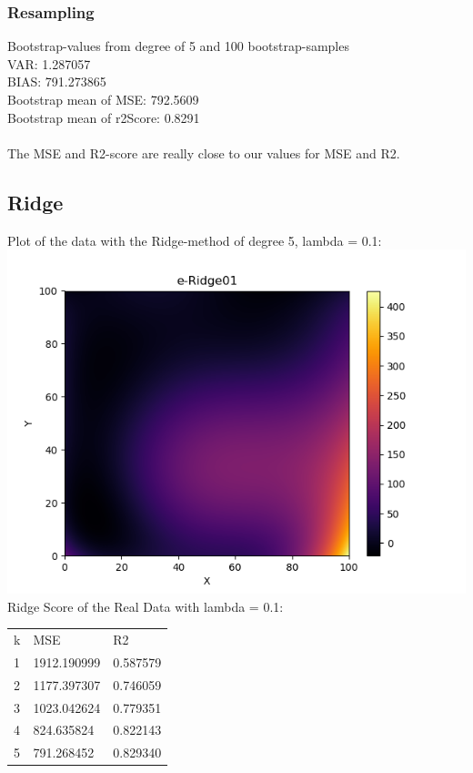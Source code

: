 \documentclass[a4paper,norsk]{article}
\begin{document}
\subsubsection{Resampling}
Bootstrap-values from degree of 5 and 100 bootstrap-samples
\\VAR: 1.287057
\\BIAS: 791.273865
\\Bootstrap mean of MSE: 792.5609
\\Bootstrap mean of r2Score: 0.8291
\\
\\The MSE and R2-score are really close to our values for MSE and R2.

\subsection{Ridge}
Plot of the data with the Ridge-method of degree 5, lambda = 0.1:
\\ \includegraphics[scale=.7]{e-Ridge01}
\\ Ridge Score of the Real Data with lambda = 0.1:
\begin{table}[!h]
\begin{tabular}{lll}
k & MSE                   & R2                 \\
1 & 1912.190999  & 0.587579 \\
2 & 1177.397307  & 0.746059 \\
3 & 1023.042624  & 0.779351 \\
4 & 824.635824  & 0.822143 \\
5 & 791.268452 & 0.829340
\end{tabular}
\end{table}
\end{document}
